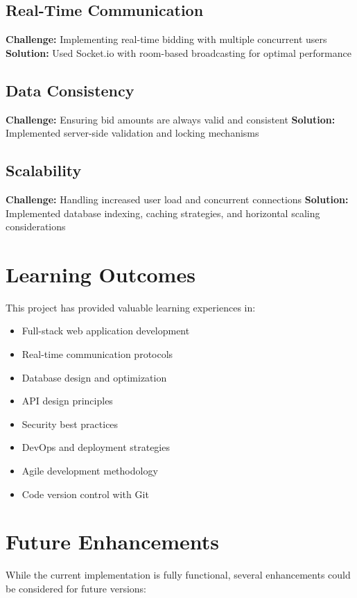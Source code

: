\subsection{Real-Time Communication}
\textbf{Challenge:} Implementing real-time bidding with multiple concurrent users
\textbf{Solution:} Used Socket.io with room-based broadcasting for optimal performance

\subsection{Data Consistency}
\textbf{Challenge:} Ensuring bid amounts are always valid and consistent
\textbf{Solution:} Implemented server-side validation and locking mechanisms

\subsection{Scalability}
\textbf{Challenge:} Handling increased user load and concurrent connections
\textbf{Solution:} Implemented database indexing, caching strategies, and horizontal scaling considerations

\section{Learning Outcomes}

This project has provided valuable learning experiences in:

\begin{itemize}
    \item Full-stack web application development
    \item Real-time communication protocols
    \item Database design and optimization
    \item API design principles
    \item Security best practices
    \item DevOps and deployment strategies
    \item Agile development methodology
    \item Code version control with Git
\end{itemize}

\section{Future Enhancements}

While the current implementation is fully functional, several enhancements could be considered for future versions:

